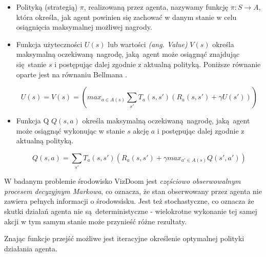 \begin{itemize}
\item Polityką (strategią) $\pi$, realizowaną przez agenta, nazywamy funkcję $ \pi: S \rightarrow A$, która określa, jak agent powinien się zachować w danym stanie w celu osiągnięcia maksymalnej możliwej nagrody.
\item Funkcja użyteczności $U(s)$ lub wartości \textit{(ang. Value)} $V(s)$ określa maksymalną oczekiwaną nagrodę, jaką agent może osiągnąć znajdując się stanie $s$ i postępując dalej zgodnie z aktualną polityką. Poniższe równanie oparte jest na równaniu Bellmana \cite{bellman1954}.

$$U(s) = V(s) = (max_{a \in A(s)} \sum_{s'} T_a(s,s')(R_a(s,s') + \gamma U(s')))$$
\item Funkcja Q $Q(s,a)$ określa maksymalną oczekiwaną nagrodę, jaką agent może osiągnąć wykonując w stanie $s$ akcję $a$ i postępując dalej zgodnie z aktualną polityką.

$$Q(s,a) = \sum_{s'} T_a(s,s')(R_a(s,s') + \gamma max_{a' \in A(s)}Q(s',a'))$$

\end{itemize}

\vspace{5mm}

W badanym problemie środowisko VizDoom jest \textit{częściowo obserwowalnym procesem decyzyjnym Markowa}, co oznacza, że stan obserwowany przez agenta nie zawiera pełnych informacji o środowsisku. Jest też stochastyczne, co oznacza że skutki działań agenta nie są deterministyczne - wielokrotne wykonanie tej samej akcji w tym samym stanie może przynieść różne rezultaty.

Znając funkcje przejść możliwe jest iteracyjne określenie optymalnej polityki działania agenta. 


